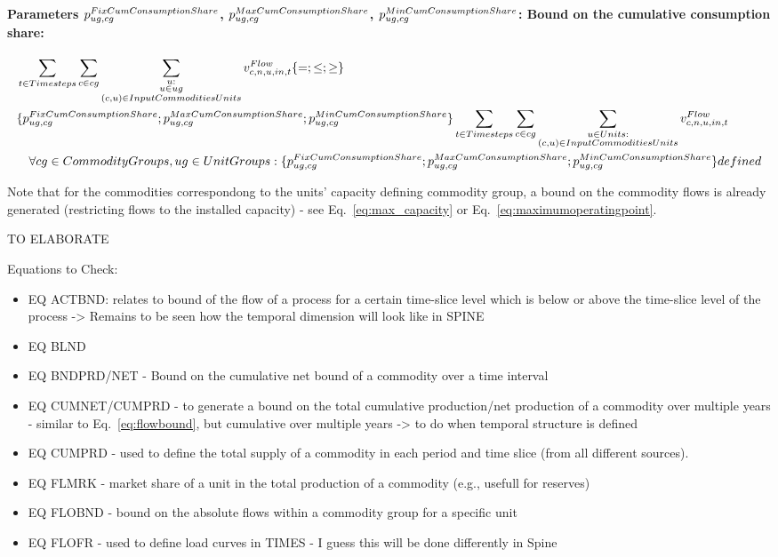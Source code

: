 \paragraph{Parameters $\pFixCumConsumptionShare$, $\pMaxCumConsumptionShare$, $\pMinCumConsumptionShare$: Bound on the cumulative consumption share:}
\begin{align} \label{eq:cumconsumptionshare}
&\sum_{\timesteps} \sum_{\commodity \in \commoditygroup} \sum_{\substack{\unit: \\ \unit \in \unitgroup \\ \InputCommoditiesUnits}} \vFlow[\commodity,\node,\unit,in,\timestep] \{=;\le;\ge\} \nonumber \\
&\{ \pFixCumConsumptionShare ; \pMaxCumConsumptionShare ; \pMinCumConsumptionShare \} \sum_{\timesteps} \sum_{\commodity \in \commoditygroup} \sum_{\substack{\units: \\ \InputCommoditiesUnits}} \vFlow[\commodity,\node, \unit,in,\timestep] \nonumber \\
&\quad \forall \commoditygroups, \unitgroups: \{ \pFixCumConsumptionShare ; \pMaxCumConsumptionShare ; \pMinCumConsumptionShare \} defined
\end{align}


Note that for the commodities correspondong to the units' capacity defining commodity group, a bound on the commodity flows is already generated (restricting flows to the installed capacity) - see Eq.~\eqref{eq:max_capacity} or Eq.~\eqref{eq:maximumoperatingpoint}.

{\color{red} TO ELABORATE

Equations to Check:
\begin{itemize}
	\item EQ ACTBND: relates to bound of the flow of a process for a certain time-slice level which is below or above the time-slice level of the process -> Remains to be seen how the temporal dimension will look like in SPINE
	\item EQ BLND
	\item EQ BNDPRD/NET - Bound on the cumulative net bound of a commodity over a time interval
	\item EQ CUMNET/CUMPRD - to generate a bound on the total cumulative production/net production of a commodity over multiple years - similar to Eq.~\eqref{eq:flowbound}, but cumulative over multiple years -> to do when temporal structure is defined
	\item EQ CUMPRD - used to define the total supply of a commodity in each period and time slice (from all different sources).
	\item EQ FLMRK - market share of a unit in the total production of a commodity (e.g., usefull for reserves)
	\item EQ FLOBND - bound on the absolute flows within a commodity group for a specific unit
	\item EQ FLOFR - used to define load curves in TIMES - I guess this will be done differently in Spine
\end{itemize}
}


